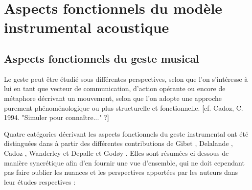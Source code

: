 \section{Aspects fonctionnels du modèle instrumental acoustique}

\subsection{Aspects fonctionnels du geste musical}

Le geste peut être étudié sous différentes perspectives, selon que l'on s'intéresse à lui en tant que vecteur de communication, d'action opérante ou encore de métaphore décrivant un mouvement, selon que l'on adopte une approche purement phénoménologique ou plus structurelle et fonctionnelle. [cf. Cadoz, C. 1994. "Simuler pour connaître..." ?]

Quatre catégories décrivant les aspects fonctionnels du geste instrumental ont été distinguées dans \cite{jensenius_musical_2010} à partir des différentes contributions de Gibet \cite{gibet_codage_1987}, Delalande \cite{delalande_geste_1988}, Cadoz \cite{cadoz_gesture_2000}, Wanderley et Depalle\cite{wanderley_gestural_2004} et Godøy \cite{godoy_exploring_2006}. Elles sont résumées ci-dessous de manière syncrétique afin d'en fournir une vue d'ensemble, qui ne doit cependant pas faire oublier les nuances et les perspectives apportées par les auteurs dans leur études respectives :

